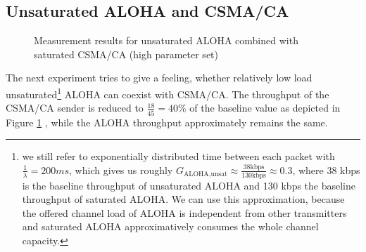 \clearpage

\subsection{Unsaturated ALOHA and CSMA/CA}
\label{sec:unsat-aloha-csma}

\begin{figure}[tb]
	\label{fig:results-unsat-aloha-csma-2}
	\begin{center}
		\centerline{
		}	
	\end{center}
	\caption{Measurement results for unsaturated ALOHA combined with saturated CSMA/CA (high parameter set)}
\end{figure}

The next experiment tries to give a feeling, whether relatively low load unsaturated\footnote{we still refer to exponentially distributed time between each packet with $\frac{1}{\lambda}=200ms$, which gives us roughly $G_\text{ALOHA,unsat} \approx \frac{38 \text{kbps}}{130 \text{kbps}}\approx 0.3$, where 38 kbps is the baseline throughput of unsaturated ALOHA and 130 kbps the baseline throughput of saturated ALOHA. We can use this approximation, because the offered channel load of ALOHA is independent from other transmitters and saturated ALOHA approximatively consumes the whole channel capacity.} ALOHA can coexist with CSMA/CA. The throughput of the CSMA/CA sender is reduced to $\frac{18}{45}=40\%$ of the baseline value as depicted in Figure \ref{fig:results-unsat-aloha-csma-2} , while the ALOHA throughput approximately remains the same.

